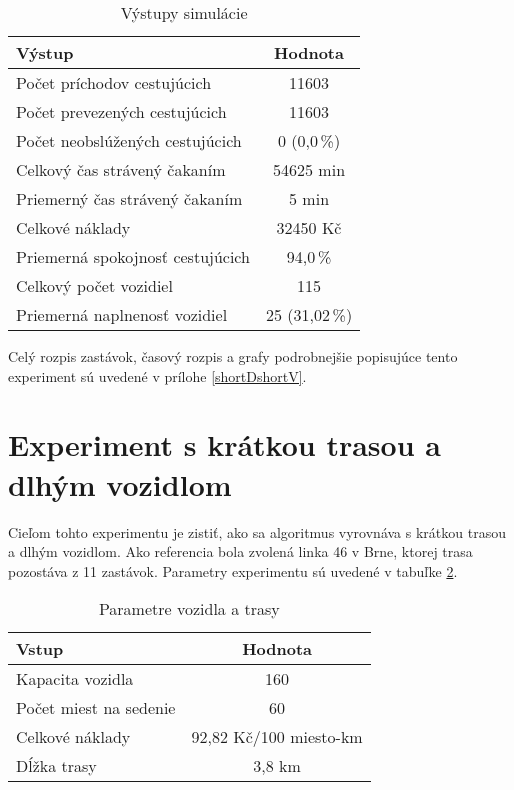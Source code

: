 \begin{table}[h]
  \centering
  \begin{tabular}{|l|c|}
    \hline
      \textbf{Výstup} & \textbf{Hodnota} \\ \hline
      Počet príchodov cestujúcich & 11603 \\ \hline
      Počet prevezených cestujúcich & 11603 \\ \hline
      Počet neobslúžených cestujúcich & 0 (0,0\,\%) \\ \hline
      Celkový čas strávený čakaním & 54625 min \\ \hline
      Priemerný čas strávený čakaním & 5 min \\ \hline
      Celkové náklady & 32450 Kč \\ \hline
      Priemerná spokojnosť cestujúcich & 94,0\,\% \\ \hline
      Celkový počet vozidiel & 115 \\ \hline
      Priemerná naplnenosť vozidiel & 25 (31,02\,\%) \\ \hline
  \end{tabular}
  \caption{Výstupy simulácie}
  \label{tab:shortDshortVout}
\end{table}

Celý rozpis zastávok, časový rozpis a grafy podrobnejšie popisujúce tento experiment sú uvedené v prílohe \ref{shortDshortV}.

\newpage

\section{Experiment s krátkou trasou a dlhým vozidlom}
Cieľom tohto experimentu je zistiť, ako sa algoritmus vyrovnáva s krátkou trasou a dlhým vozidlom.
Ako referencia bola zvolená linka 46 v Brne, ktorej trasa pozostáva z 11 zastávok.
Parametry experimentu sú uvedené v tabuľke \ref{tab:shortDlongVin}.

\begin{table}[h]
  \centering
  \begin{tabular}{|l|c|}
    \hline
    \textbf{Vstup} & \textbf{Hodnota} \\ \hline
    Kapacita vozidla & 160 \\ \hline
    Počet miest na sedenie & 60 \\ \hline
    Celkové náklady & 92,82 Kč/100 miesto-km \\ \hline
    Dĺžka trasy & 3,8 km \\ \hline
  \end{tabular}
  \caption{Parametre vozidla a trasy}
  \label{tab:shortDlongVin}
\end{table}

